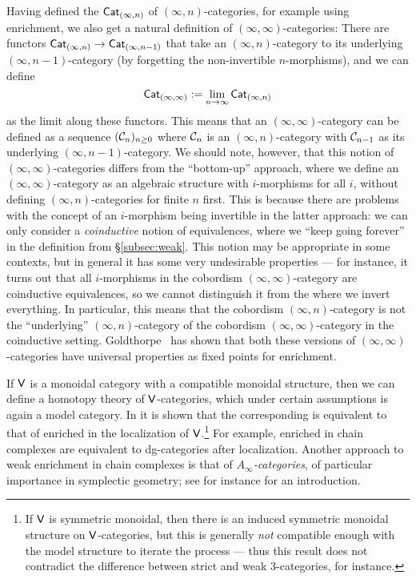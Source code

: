 \documentclass[a4paper,11pt]{article}
\begin{document}
\begin{remark}\label{rmk:coind}
  Having defined the \icats{} $\textup{\textsf{Cat}}_{(\infty,n)}$ of
  $(\infty,n)$-categories, for example using enrichment, we also get a
  natural definition of $(\infty,\infty)$-categories: There are
  functors $\Cat_{(\infty,n)} \to \Cat_{(\infty,n-1)}$ that take an
  $(\infty,n)$-category to its underlying $(\infty,n-1)$-category (by
  forgetting the non-invertible $n$-morphisms), and we can define
  \[ \textup{\textsf{Cat}}_{(\infty,\infty)} := \operatorname*{lim}_{n \rightarrow \infty} \textup{\textsf{Cat}}_{(\infty,n)}\]
  as the limit along these functors. This means that an
  $(\infty,\infty)$-category can be defined as a sequence
  $(\mathcal{C}_{n})_{n\geq 0}$ where $\mathcal{C}_{n}$ is an $(\infty,n)$-category
  with $\mathcal{C}_{n-1}$ as its underlying $(\infty,n-1)$-category. We
  should note, however, that this notion of
  $(\infty,\infty)$-categories differs from the ``bottom-up'' approach,
  where we define an $(\infty,\infty)$-category as an algebraic
  structure with $i$-morphisms for all $i$, without defining
  $(\infty,n)$-categories for finite $n$ first. This is because there
  are problems with the concept of an $i$-morphism being invertible in
  the latter approach: we can only consider a \emph{coinductive}
  notion of equivalences, where we ``keep going forever'' in the
  definition from \S\ref{subsec:weak}. This notion may be appropriate
  in some contexts, but in general it has some very undesirable
  properties --- for instance, it turns out that all $i$-morphisms in
  the cobordism $(\infty,\infty)$-category are coinductive
  equivalences, so we cannot distinguish it from the \igpd{} where we
  invert everything. In particular, this means that the cobordism
  $(\infty,n)$-category is not the ``underlying''
  $(\infty,n)$-category of the cobordism $(\infty,\infty)$-category in
  the coinductive setting.  Goldthorpe~\cite{Goldthorpe} has shown
  that both these versions of $(\infty,\infty)$-categories have
  universal properties as fixed points for \icatl{} enrichment.
\end{remark}

\begin{remark}
  If $\textup{\textsf{V}}$ is a monoidal category with a compatible monoidal
  structure, then we can define a homotopy theory of $\textup{\textsf{V}}$-categories,
  which under certain assumptions is again a model category. In
  \cite{enrcomp} it is shown that the corresponding \icat{} is
  equivalent to that of \icats{} enriched in the \icatl{} localization
  of $\textup{\textsf{V}}$.\footnote{If $\textup{\textsf{V}}$ is symmetric monoidal, then there is an
    induced symmetric monoidal structure on $\textup{\textsf{V}}$-categories, but this
    is generally \emph{not} compatible enough with the model structure
    to iterate the process --- thus this result does not contradict
    the difference between strict and weak $3$-categories, for
    instance.}  For example, \icats{} enriched in chain complexes are
  equivalent to dg-categories after \icatl{} localization. Another
  approach to weak enrichment in chain complexes is that of
  \emph{$A_{\infty}$-categories}, of particular importance in
  symplectic geometry; see for instance \cite{KellerAinfty} for an
  introduction.
\end{remark}
\end{document}
